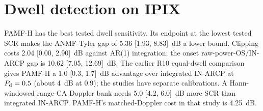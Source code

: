 \documentclass[10pt]{article}
\begin{document}
\section{Dwell detection on IPIX}\label{sup:dwell}
\begin{table}[h]
\centering\small
\caption{SCR (dB) for $P_{\rm d}=0.5$ and $0.9$ over an 8-pulse dwell: persistent Swerling-1 target with random Doppler from the first dwell pulse (IPIX, conformal thresholds). $\le-5$: reached at the lowest SCR tested; n.r.: not reached at 25~dB.}
\label{tab:dwellsup}

\end{table}

PAMF-H has the best tested dwell sensitivity. Its endpoint at the lowest tested SCR makes the ANMF-Tyler gap of 5.36 [1.93, 8.83]~dB a lower bound. Clipping costs 2.04 [0.00, 2.90]~dB against AR(1) integration; the onset raw-power-OS/IN-ARCP gap is 10.62 [7.05, 12.69]~dB. The earlier R10 equal-dwell comparison gives PAMF-H a 1.0 [0.3, 1.7]~dB advantage over integrated IN-ARCP at $P_{\rm d}=0.5$ (about 4~dB at 0.9); the studies have separate calibrations. A Hann-windowed range-CA Doppler bank needs 5.0 [4.2, 6.0]~dB more SCR than integrated IN-ARCP. PAMF-H's matched-Doppler cost in that study is 4.25~dB.
\end{document}

